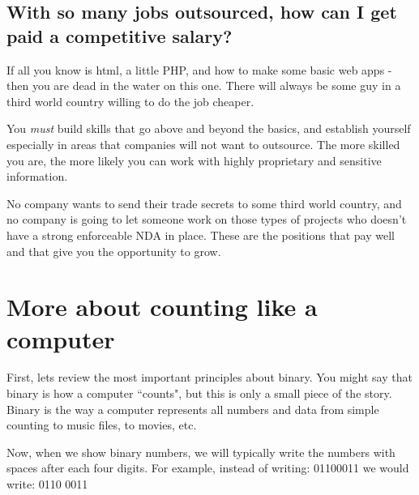 \documentclass[a4paper,12pt]{article}
\let\stdsection\section
\renewcommand\section{\newpage\stdsection}
\begin{document}
\subsection{With so many jobs outsourced, how can I get paid a competitive salary?}
If all you know is html, a little PHP, and how to make some basic web apps - then you are dead in the water on this one. There will always be some guy in a third world country willing to do the job cheaper.

You \emph{must} build skills that go above and beyond the basics, and establish yourself especially in areas that companies will not want to outsource. The more skilled you are, the more likely you can work with highly proprietary and sensitive information.

No company wants to send their trade secrets to some third world country, and no company is going to let someone work on those types of projects who doesn't have a strong enforceable NDA in place. These are the positions that pay well and that give you the opportunity to grow.

\section{More about counting like a computer}
First, lets review the most important principles about binary. You might say that binary is how a computer ``counts", but this is only a small piece of the story. Binary is the way a computer represents all numbers and data from simple counting to music files, to movies, etc.

Now, when we show binary numbers, we will typically write the numbers with spaces after each four digits. For example, instead of writing: 01100011 we would write: 0110 0011
\end{document}

